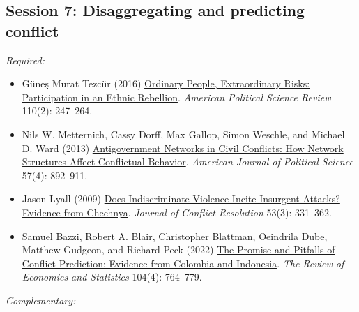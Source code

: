\documentclass[12pt, a4paper]{article}
\begin{document}


\vspace{20pt}
\hline
\subsection*{Session 7: Disaggregating and predicting conflict}

\noindent\textit{Required:}

\begin{itemize}
	\item Güne\c{s} Murat Tezcür (2016) \href{https://doi.org/10.1017/S0003055416000150}{Ordinary People, Extraordinary Risks: Participation in an Ethnic Rebellion}. \textit{American Political Science Review} 110(2): 247--264.
	\item Nils W. Metternich, Cassy Dorff, Max Gallop, Simon Weschle, and Michael D. Ward (2013) \href{https://doi.org/10.1111/ajps.12039}{Antigovernment Networks in Civil Conflicts: How Network Structures Affect Conflictual Behavior}. \textit{American Journal of Political Science} 57(4): 892--911.
	\item Jason Lyall (2009) \href{https://doi.org/10.1177/0022002708330881}{Does Indiscriminate Violence Incite Insurgent Attacks? Evidence from Chechnya}. \textit{Journal of Conflict Resolution} 53(3): 331--362.
	\item Samuel Bazzi, Robert A. Blair, Christopher Blattman, Oeindrila Dube, Matthew Gudgeon, and Richard Peck (2022) \href{https://doi.org/10.1162/rest_a_01016}{The Promise and Pitfalls of Conflict Prediction: Evidence from Colombia and Indonesia}. \textit{The Review of Economics and Statistics} 104(4): 764--779.
\end{itemize}


\noindent\textit{Complementary:}
\end{document}
